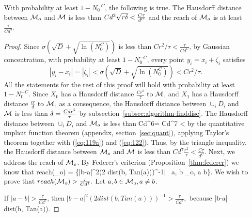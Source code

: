 \documentclass[final, 12pt]{colt2018} %
\begin{document}
\begin{theorem}%
With probability at least $1 - N_0^{-C}$, the following is true.
The Hausdorff distance between $\mathcal M_o$ and $ \mathcal M$ is less than $Cd^3 \sqrt{r{\mathbf{\delta}}} < \frac{C\tau}{d^C}$ and the reach of $\mathcal M_o$ is at least $\frac{\tau}{Cd^{7}}$.
\end{theorem}
\begin{proof}
Since $ \sigma (\sqrt{D} + \sqrt{\ln (N_0^C)})$ is less than $Cr^2/\tau < \frac{\tau}{Cd^C}$, by Gaussian concentration, with probability at least $ 1 - N_0^{-C}$, every point $y_i = x_i + \zeta_i$ satisfies 
$$|y_i - x_i| = |\zeta_i| <  \sigma (\sqrt{D} + \sqrt{\ln (N_0^C)}) < Cr^2/\tau.$$ All the statements for the rest of this proof will hold with probability at least $1-N_0^{-C}$. Since $X_0$ has a Hausdorff distance $\frac{Cr^2}{\tau}$ to $\mathcal M$, and $X_1$ has a Hausdorff distance $\frac{cr}{d}$ to $\mathcal M$, as a consequence,   the Hausdorff distance between $\cup_i D_i$ and $\mathcal M$ is less than ${\mathbf{\delta}} = \frac{Cdr^2}{\tau}$ by subsection~\ref{subsec:algorithm-finddisc}.
The Hausdorff distance between $\cup_i D_i$ and $\mathcal M_o$ is less than \beq Cd^6\de = Cd^{7}  < \eeq by the quantitative implicit function theorem (appendix, section~\ref{sec:quant}), applying Taylor's theorem together with (\ref{eq:119a}) and (\ref{eq:122}). Thus, by the triangle inequality, 
the Hausdorff distance between $\mathcal M_o$ and $\mathcal M$ is less than $Cd^{7}{\frac{r^2}{\tau}} < \frac{C\tau}{d^C}.$
Next, we address the reach of $\mathcal M_o$.
By Federer's criterion (Proposition~\ref{thm:federer}) we know that 
\beq reach(\MM_o) = \inf\left\{|b-a|^{2}(2 dist(b, Tan(a)))^{-1}\big| \, a, b \in \MM_o, a \neq b\right\}.\eeq
We wish to prove that $reach(\mathcal M_o) > \frac{\tau}{Cd^7}.$ Let $ a, b \in \mathcal M_o, a \neq b$.

 If $|a - b| > \frac{\tau}{Cd^7}$, then $|b-a|^{2}(2 dist(b, Tan(a)))^{-1} > \frac{\tau}{Cd^7},$ because 
\beqs |b-a| \geq dist(b, Tan(a)). \eeqs


\end{proof}
\end{document}
